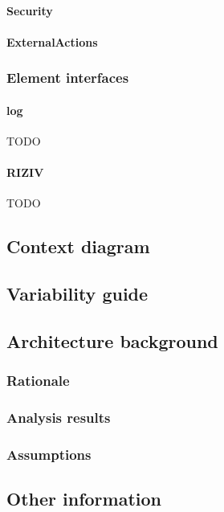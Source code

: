 \documentclass[a4paper,10pt]{book}
\begin{document}
\paragraph{Security}

\paragraph{ExternalActions}

\subsubsection{Element interfaces} 

\paragraph{log}
TODO

\paragraph{RIZIV}
TODO

\subsection{Context diagram}

\subsection{Variability guide}

\subsection{Architecture background}

\subsubsection{Rationale}

\subsubsection{Analysis results}

\subsubsection{Assumptions}

\subsection{Other information}
\end{document}
